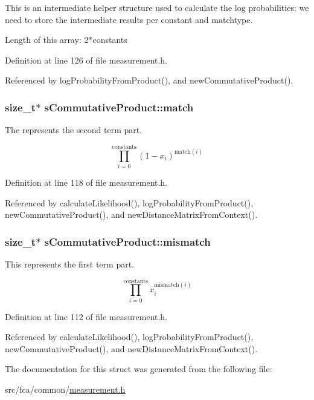 \-This is an intermediate helper structure used to calculate the log probabilities\-: we need to store the intermediate results per constant and matchtype. 

\-Length of this array\-: 2$\ast$constants 

\-Definition at line 126 of file measurement.\-h.



\-Referenced by log\-Probability\-From\-Product(), and new\-Commutative\-Product().

\hypertarget{structsCommutativeProduct_ae78261dbaf0a6455774a84836fe7334d}{
\subsubsection[{match}]{\setlength{\rightskip}{0pt plus 5cm}size\-\_\-t$\ast$ {\bf s\-Commutative\-Product\-::match}}}\label{structsCommutativeProduct_ae78261dbaf0a6455774a84836fe7334d}


\-The represents the second term part. 

\[ \prod_{i=0}^{\mathrm{constants}} (1-x_i)^{\mathrm{match}(i)} \] 

\-Definition at line 118 of file measurement.\-h.



\-Referenced by calculate\-Likelihood(), log\-Probability\-From\-Product(), new\-Commutative\-Product(), and new\-Distance\-Matrix\-From\-Context().

\hypertarget{structsCommutativeProduct_a95aa7c0ea80854b88afc16d913137f35}{
\subsubsection[{mismatch}]{\setlength{\rightskip}{0pt plus 5cm}size\-\_\-t$\ast$ {\bf s\-Commutative\-Product\-::mismatch}}}\label{structsCommutativeProduct_a95aa7c0ea80854b88afc16d913137f35}


\-This represents the first term part. 

\[ \prod_{i=0}^{\mathrm{constants}} x_i^{\mathrm{mismatch}(i)} \] 

\-Definition at line 112 of file measurement.\-h.



\-Referenced by calculate\-Likelihood(), log\-Probability\-From\-Product(), new\-Commutative\-Product(), and new\-Distance\-Matrix\-From\-Context().



\-The documentation for this struct was generated from the following file\-:\begin{DoxyCompactItemize}
\item 
src/fca/common/\hyperlink{common_2measurement_8h}{measurement.\-h}\end{DoxyCompactItemize}
